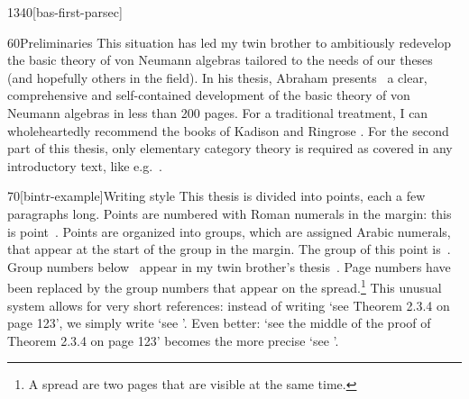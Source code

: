 \begin{parsec}{1340}[bas-first-parsec]
\begin{point}{60}{Preliminaries}
This situation has led my twin brother to ambitiously
     redevelop the basic theory of von Neumann algebras
     tailored to the needs of our theses (and hopefully others
     in the field).
In his thesis, Abraham presents~\cite{bram}
    a clear, comprehensive and self-contained development of the basic
    theory of von Neumann algebras in less than 200 pages.
For a traditional treatment,
    I can wholeheartedly recommend the books of Kadison and Ringrose \cite{kr}.
For the second part of this thesis,
    only elementary category theory is required
    as covered in any introductory text, like e.g.~\cite{awodey}.
\end{point}
\begin{point}{70}[bintr-example]{Writing style}%
This thesis is divided into points,
    each a few paragraphs long.
Points are numbered with Roman numerals in the margin:
    this is point~.
Points  are organized into groups,
    which are assigned Arabic numerals,
    that appear at the start of the group in the margin.
The group of this point is~.
Group numbers below~
    appear in my twin brother's thesis~\cite{bram}.
Page numbers have been replaced by the
    group numbers that appear on the spread.\footnote{%
        A spread are two pages that are visible at the same time.}
This unusual system allows for
    very short references:
    instead of writing `see Theorem 2.3.4 on page 123',
    we simply write `see '.
Even better: `see the middle of the proof of Theorem 2.3.4 on page 123'
    becomes the more precise `see '.


\end{point}
\end{parsec}

